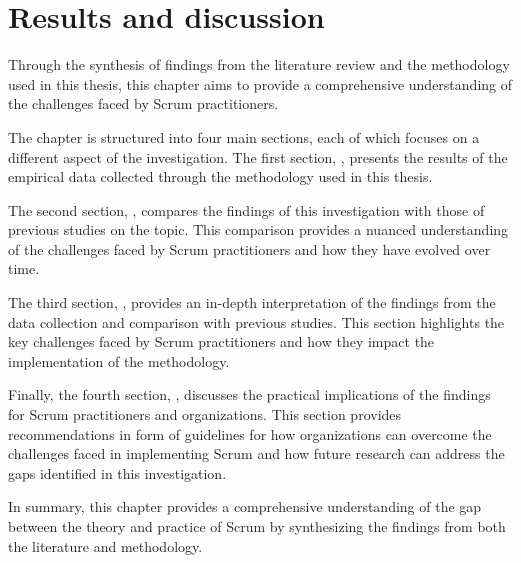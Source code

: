 \chapter{Results and discussion}\label{cha:Discussion}
Through the synthesis of findings from the literature review and the \gls{methodology} used in this thesis, this chapter aims to provide a comprehensive understanding of the challenges faced by Scrum practitioners.

The chapter is structured into four main sections, each of which focuses on a different aspect of the investigation. The first section, , presents the results of the empirical data collected through the \gls{methodology} used in this thesis.

The second section, , compares the findings of this investigation with those of previous studies on the topic. This comparison provides a nuanced understanding of the challenges faced by Scrum practitioners and how they have evolved over time.

The third section, , provides an in-depth interpretation of the findings from the data collection and comparison with previous studies. This section highlights the key challenges faced by Scrum practitioners and how they impact the implementation of the \gls{methodology}.

Finally, the fourth section, , discusses the practical implications of the findings for Scrum practitioners and organizations. This section provides recommendations in form of \glspl{guideline} for how organizations can overcome the challenges faced in implementing Scrum and how future research can address the gaps identified in this investigation.

In summary, this chapter provides a comprehensive understanding of the gap between the theory and practice of Scrum by synthesizing the findings from both the literature and \gls{methodology}.

